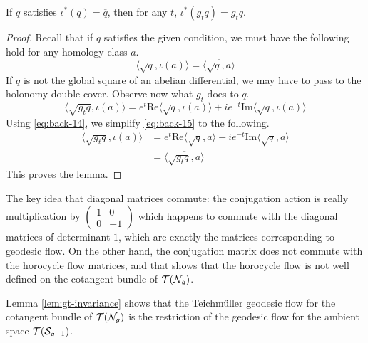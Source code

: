 \documentclass[12pt, reqno]{amsart}
\begin{document}
\begin{lemma}
  \label{lem:gt-invariance}
  If $q$ satisfies $\iota^{\ast}(q) = \overline{q}$, then for any $t$, $\iota^{\ast}(g_tq) = \overline{g_tq}$.
\end{lemma}
\begin{proof}
  Recall that if $q$ satisfies the given condition, we must have the following hold for any homology class $a$.
  \begin{equation}
    \label{eq:back-14}
    \langle \sqrt{q}, \iota(a) \rangle = \overline{ \langle \sqrt{q}, a \rangle}
  \end{equation}
  If $q$ is not the global square of an abelian differential, we may have to pass to the holonomy double
  cover. Observe now what $g_t$ does to $q$.
  \begin{equation}
    \label{eq:back-15}
    \langle \sqrt{g_t q}, \iota(a) \rangle = e^t \mathrm{Re} \langle \sqrt{q}, \iota(a) \rangle + i e^{-t} \mathrm{Im}\langle \sqrt{q}, \iota(a) \rangle
  \end{equation}
  Using \eqref{eq:back-14}, we simplify \eqref{eq:back-15} to the following.
  \begin{align}
    \label{eq:back-16}
    \langle \sqrt{g_t q}, \iota(a) \rangle &= e^t \mathrm{Re} \langle \sqrt{q}, a \rangle - i e^{-t} \mathrm{Im}\langle \sqrt{q}, a \rangle \\
                                           &= \overline{\langle \sqrt{g_tq}, a \rangle}
  \end{align}
  This proves the lemma.
\end{proof}
\begin{remark}
  The key idea that diagonal matrices commute:
  the conjugation action is really multiplication by $
  \begin{pmatrix}
    1 & 0 \\
    0 & -1
  \end{pmatrix}
  $ which happens to commute with the diagonal matrices of determinant $1$, which are exactly the matrices
  corresponding to geodesic flow. On the other hand, the conjugation matrix does not commute with the horocycle
  flow matrices, and that shows that the horocycle flow is not well defined on the cotangent bundle
  of $\mathcal{T}(\mathcal{N}_g)$.
\end{remark}
Lemma \ref{lem:gt-invariance} shows that the Teichm\"uller geodesic flow for the cotangent bundle of $\mathcal{T}(\mathcal{N}_g)$ is the restriction of the geodesic flow for the ambient space $\mathcal{T}(\mathcal{S}_{g-1})$.
\end{document}
